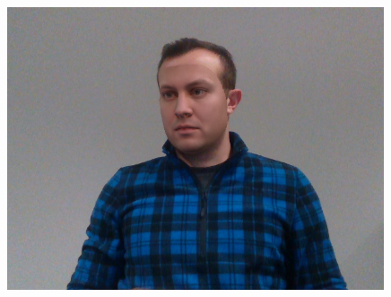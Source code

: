\begin{figure}[h]
\begin{minipage}{.325\textwidth}
      \includegraphics[width=0.99\textwidth]{Figures/dataset/blended/5.png}
    \end{minipage}


\end{figure}
